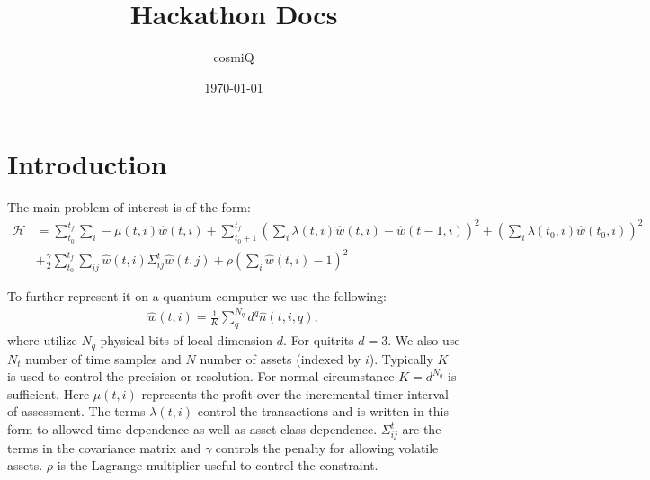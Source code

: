 \documentclass[12pt]{article}
\title{Hackathon Docs}
\author{cosmiQ}
\date{\today}
\begin{document}
\maketitle

\section*{Introduction}

The main problem of interest is of the form:
\begin{align}
\mathcal{H} &= \sum_{t_0}^{t_f} \sum_i -\mu(t,i) \hat{w}(t,i) + \sum_{t_0+1}^{t_f} \left(\sum_i \lambda(t,i) \hat{w}(t,i) - \hat{w}(t-1,i) \right)^2 +  \left(\sum_i \lambda(t_0,i) \hat{w}(t_0,i)\right)^2\nonumber\\
&+ \frac{\gamma}{2} \sum_{t_0}^{t_f} \sum_{ij} \hat{w}(t,i) \Sigma^t_{ij} \hat{w}(t,j) + \rho \left(\sum_i \hat{w}(t,i) - 1\right)^2
\end{align}

To further represent it on a quantum computer we use the following:
\begin{align}
\hat{w}(t,i) = \frac{1}{K}\sum_q^{N_q} d^q \hat{n}(t,i,q),
\end{align}
where utilize $N_q$ physical bits of local dimension $d$. For quitrits $d = 3$. We also use $N_t$ number of time samples and $N$ number of assets (indexed by $i$). Typically $K$ is used to control the precision or resolution. For normal circumstance $K = d^{N_q}$ is sufficient. Here $\mu(t,i)$ represents the profit over the incremental timer interval of assessment. The terms $\lambda(t,i)$ control the transactions and is written in this form to allowed time-dependence as well as asset class dependence. $\Sigma^t_{ij}$ are the terms in the covariance matrix and $\gamma$ controls the penalty for allowing volatile assets. $\rho$ is the Lagrange multiplier useful to control the constraint.
\end{document}
